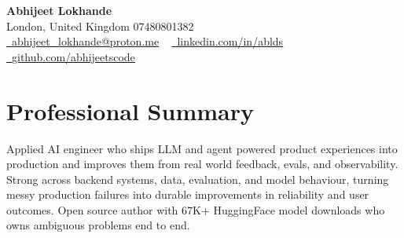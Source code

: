 \documentclass[a4paper,10pt]{article}
\begin{document}
    \begin{center}
        {\Huge\bfseries Abhijeet Lokhande}
        \\[2pt] {\color{muted}London, United Kingdom \textbar{} 07480801382}\\
        \small
        \href{mailto:abhijeet_lokhande@proton.me}{\raisebox{-0.2\height}{\color{primary}\faEnvelope}\  \underline{abhijeet\_lokhande@proton.me}} ~
        \href{https://www.linkedin.com/in/ablds/}{\raisebox{-0.2\height}{\color{primary}\faLinkedin}\ \underline{linkedin.com/in/ablds}}  ~
        \href{https://github.com/abhijeetscode}{\raisebox{-0.2\height}{\color{primary}\faGithub}\ \underline{github.com/abhijeetscode}}
    \end{center}

\section{Professional Summary}
\vspace{-5pt}
{\color{muted}Applied AI engineer who ships LLM and agent powered product experiences into production and improves them from real world feedback, evals, and observability. Strong across backend systems, data, evaluation, and model behaviour, turning messy production failures into durable improvements in reliability and user outcomes. Open source author with 67K+ HuggingFace model downloads who owns ambiguous problems end to end.}
\vspace{2pt}

\end{document}
